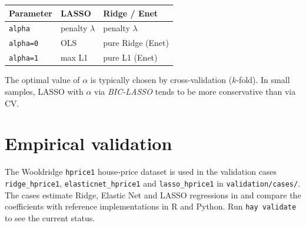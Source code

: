 \begin{center}
\begin{tabular}{lll}
\toprule
\textbf{Parameter} & \textbf{LASSO} & \textbf{Ridge / Enet} \\
\midrule
\texttt{alpha} & penalty $\lambda$ & penalty $\lambda$ \\
\texttt{alpha=0} & OLS & pure Ridge (Enet) \\
\texttt{alpha=1} & max L1 & pure L1 (Enet) \\
\bottomrule
\end{tabular}
\end{center}

\begin{nota}
  The optimal value of $\alpha$ is typically chosen by cross-validation
  ($k$-fold). In small samples, LASSO with $\alpha$ via \emph{BIC-LASSO}
  tends to be more conservative than via CV.
\end{nota}

\section{Empirical validation}

The Wooldridge \texttt{hprice1} house-price dataset is used in the
validation cases \texttt{ridge\_hprice1}, \texttt{elasticnet\_hprice1} and
\texttt{lasso\_hprice1} in \texttt{validation/cases/}. The cases estimate Ridge,
Elastic Net and LASSO regressions in \hayashi{} and compare the coefficients
with reference implementations in R and Python. Run \lstinline{hay validate} to
see the current status.
